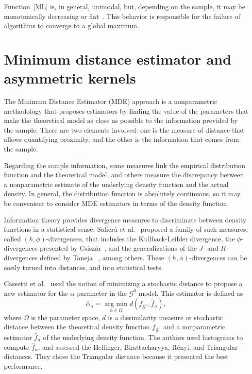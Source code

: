 \documentclass[twocolumn]{svjour3}
\newcommand{\argmin}{\operatorname*{\text{arg min }}}
\begin{document}
	Function~\eqref{ML} is, in general, unimodal, but, depending on the sample, it may be monotonically decreasing or flat~\cite{FreryCribariSouza:JASP:04}. 
	This behavior is responsible for the failure of algorithms to converge to a global maximum.
	
	
	\section{Minimum distance estimator and asymmetric kernels}
	\label{distancekernel}
	
	The Minimum Distance Estimator (MDE) approach is a nonparametric methodology that proposes estimators by finding the value of the parameters that make the theoretical model as close as possible to the information provided by the sample. 
	There are two elements involved: one is the measure of distance that allows quantifying proximity, and the other is the information that comes from the sample.
	
	Regarding the sample information, some measures link the empirical distribution function and the theoretical model, and others measure the discrepancy between a nonparametric estimate of the underlying density function and the actual density. 
	In general, the distribution function is absolutely continuous, so it may be convenient to consider MDE estimators in terms of the density function. 
	
	Information theory provides divergence measures to discriminate between density functions in a statistical sense. 
	Salicr\'u et al.~\cite{Salicru1994} proposed a family of such measures, called $(h,\phi)$-divergences, that includes the Kullback-Leibler divergence,  
	the $\phi$-divergences presented by Csisz\'ar~\cite{Csiszar1967}, 
	and the generalizations of the $J$- and $R$-divergences defined by Taneja ~\cite{Taneja1989}, among others.
	These $(h,\phi)$-divergences can be easily turned into distances, and into statistical tests.
	
	Cassetti et al.~\cite{APSAR2013ParameterEstimationStochasticDistances} used the notion of minimizing a stochastic distance to propose a new estimator for the $\alpha$ parameter in the $\mathcal{G}^0$ model. 
	This estimator is defined as
	\begin{equation}
		\widehat{\alpha}_n=\argmin_{\alpha\in\Omega} d(f_{\mathcal{G}^0}, \widehat{f}_n),
		\label{MDE}
	\end{equation}
	where $\Omega$ is the parameter space, $d$ is a dissimilarity measure or stochastic distance between the theoretical density function $f_{\mathcal{G}^0}$ and a nonparametric estimator $\widehat{f}_n$ of the underlying density function.
	The authors used histograms to compute $\widehat{f}_n$, and assessed the Hellinger, Bhattacharyya, R\'enyi, and Triangular distances. 
	They chose the Triangular distance because it presented the best performance.
	
\end{document}
